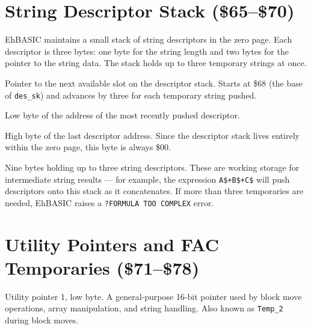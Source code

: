 \section{String Descriptor Stack (\$65--\$70)}

EhBASIC maintains a small stack of string descriptors in the zero page.  Each
descriptor is three bytes: one byte for the string length and two bytes for
the pointer to the string data.  The stack holds up to three temporary strings
at once.


Pointer to the next available slot on the descriptor stack.  Starts at
\$68 (the base of \texttt{des\_sk}) and advances by three for each temporary
string pushed.


Low byte of the address of the most recently pushed descriptor.


High byte of the last descriptor address.  Since the descriptor stack lives
entirely within the zero page, this byte is always \$00.


Nine bytes holding up to three string descriptors.  These are working storage
for intermediate string results --- for example, the expression
\texttt{A\$+B\$+C\$} will push descriptors onto this stack as it concatenates.
If more than three temporaries are needed, EhBASIC raises a
\texttt{?FORMULA TOO COMPLEX} error.

\section{Utility Pointers and FAC Temporaries (\$71--\$78)}


Utility pointer 1, low byte.  A general-purpose 16-bit pointer used by block
move operations, array manipulation, and string handling.  Also known as
\texttt{Temp\_2} during block moves.


